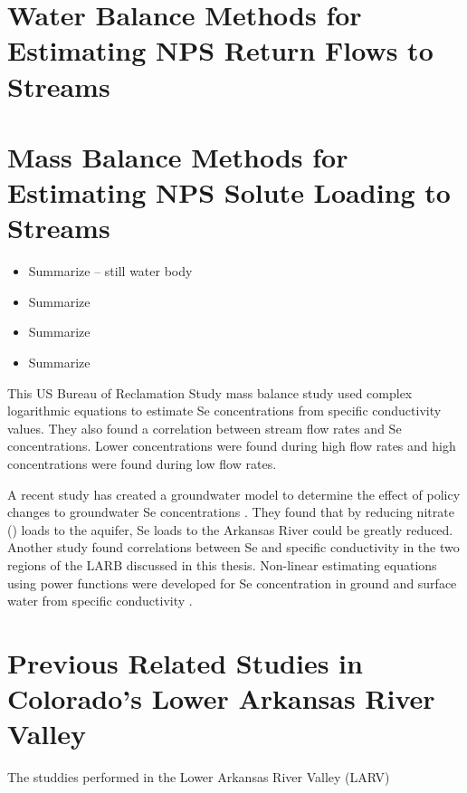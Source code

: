 \begin{linenumbers}[1]
\clearpage{}
\section{Water Balance Methods for Estimating NPS Return Flows to Streams}
\label{sec:water balance methods}

\clearpage{}
\section{Mass Balance Methods for Estimating NPS Solute Loading to Streams}
\label{sec:mass balance methods}
\begin{itemize}
	\item Summarize \parencite{Gersberg2006}-- still water body
	\item Summarize \parencite{Takayanagi1984}
	\item Summarize \parencite{Mueller2008}
	\item Summarize \parencite{Miller2010}
\end{itemize}

This US Bureau of Reclamation Study mass balance study used complex logarithmic equations to estimate Se concentrations from specific conductivity values.  They also found a correlation between stream flow rates and Se concentrations.  Lower concentrations were found during high flow rates and high concentrations were found during low flow rates.  \parencite{2008USBR}

A recent study has created a groundwater model to determine the effect of policy changes to groundwater Se concentrations \parencite{2012Bailey}.  They found that by reducing nitrate (\nitrate) loads to the aquifer, Se loads to the Arkansas River could be greatly reduced.  Another study found correlations between Se and specific conductivity in the two regions of the LARB discussed in this thesis.  Non-linear estimating equations using power functions were developed for Se concentration in ground and surface water from specific conductivity \parencite{2010Cody}.

\clearpage{}
\section{Previous Related Studies in Colorado's Lower Arkansas River Valley}
\label{sec:previous studies}

The studdies performed in the Lower Arkansas River Valley (LARV)

\clearpage{}

\end{linenumbers}
